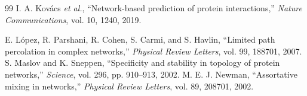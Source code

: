 \documentclass[11pt]{article}
\begin{document}
\begin{thebibliography}{99}
I. A. Kov\'acs \textit{et al.}, ``Network-based prediction of protein
interactions,'' \textit{Nature Communications}, vol. 10, 1240, 2019.

 E. L\'opez, R. Parshani, R. Cohen, S. Carmi, and S. Havlin, ``Limited path percolation in complex networks,'' \textit{Physical Review Letters}, vol. 99, 188701, 2007.
 S. Maslov and K. Sneppen, ``Specificity and stability in topology of protein networks,'' \textit{Science}, vol. 296, pp. 910--913, 2002.
 M. E. J. Newman, ``Assortative mixing in networks,'' \textit{Physical Review Letters}, vol. 89, 208701, 2002.
\end{thebibliography}

\appendix
{}


\end{document}
